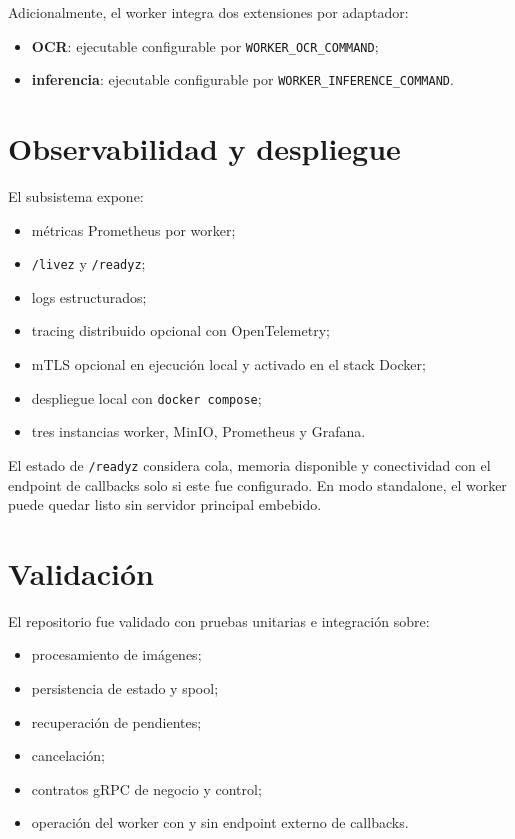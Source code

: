 \documentclass[conference]{IEEEtran}
\begin{document}
Adicionalmente, el worker integra dos extensiones por adaptador:
\begin{itemize}[leftmargin=*]
\item \textbf{OCR}: ejecutable configurable por \texttt{WORKER\_OCR\_COMMAND};
\item \textbf{inferencia}: ejecutable configurable por \texttt{WORKER\_INFERENCE\_COMMAND}.
\end{itemize}

\section{Observabilidad y despliegue}
El subsistema expone:
\begin{itemize}[leftmargin=*]
\item métricas Prometheus por worker;
\item \texttt{/livez} y \texttt{/readyz};
\item logs estructurados;
\item tracing distribuido opcional con OpenTelemetry;
\item mTLS opcional en ejecución local y activado en el stack Docker;
\item despliegue local con \texttt{docker compose};
\item tres instancias worker, MinIO, Prometheus y Grafana.
\end{itemize}

El estado de \texttt{/readyz} considera cola, memoria disponible y conectividad con el endpoint de callbacks solo si este fue configurado. En modo standalone, el worker puede quedar listo sin servidor principal embebido.

\section{Validación}
El repositorio fue validado con pruebas unitarias e integración sobre:
\begin{itemize}[leftmargin=*]
\item procesamiento de imágenes;
\item persistencia de estado y spool;
\item recuperación de pendientes;
\item cancelación;
\item contratos gRPC de negocio y control;
\item operación del worker con y sin endpoint externo de callbacks.
\end{itemize}
\end{document}
